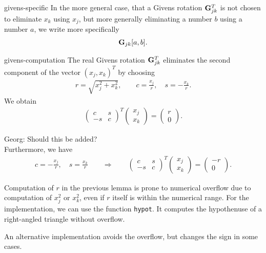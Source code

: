 \begin{Notation}{givens-specific}
  In the more general case, that a Givens rotation $\mathbf G_{jk}^T$ is
  not chosen to eliminate $x_k$ using $x_j$, but more generally
  eliminating a number $b$ using a number $a$, we write more
  specifically
  \begin{gather}
    \mathbf G_{jk}[a,b].
  \end{gather}
\end{Notation}

\begin{Lemma}{givens-computation}
  The real Givens rotation $\mathbf G_{jk}^T$ eliminates the second
  component of the vector $(x_j,x_k)^T$ by choosing
  \begin{gather}
    r = \sqrt{x_j^2+x_k^2},\qquad
    c = \frac{x_j}r,\quad s = -\frac{x_k}r.
  \end{gather}
  We obtain
  \begin{gather}
    \begin{pmatrix}
      c & s \\ -s & c
    \end{pmatrix}^T
    \begin{pmatrix}
      x_j\\x_k
    \end{pmatrix}
    =
    \begin{pmatrix}
      r\\0
    \end{pmatrix}
    .
  \end{gather}
\end{Lemma}
\begin{todo}
  Georg: Should this be added? \\
  Furthermore, we have
  \begin{gather}
    c = -\frac{x_j}r,\quad s = \frac{x_k}r
    \qquad \Rightarrow \qquad
    \begin{pmatrix}
      c & s \\ -s & c
    \end{pmatrix}^T
    \begin{pmatrix}
      x_j\\x_k
    \end{pmatrix}
    =
    \begin{pmatrix}
      -r\\0
    \end{pmatrix}
    .
  \end{gather}
\end{todo}

\begin{remark}
  Computation of $r$ in the previous lemma is prone to numerical
  overflow due to computation of $x_j^2$ or $x_k^2$, even if $r$
  itself is within the numerical range. For the implementation, we can
  use the function \lstinline!hypot!. It computes the hypothenuse of a
  right-angled triangle without overflow.

  An alternative implementation avoids the overflow, but changes the
  sign in some cases.
\end{remark}

